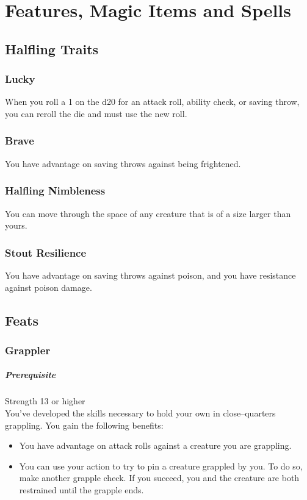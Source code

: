 \documentclass[letterpaper,openany,oneside,twocolumn]{book}
\begin{document}
\onecolumn


\rendercharactersheet

\renderbackgroundsheet

\renderspellsheet


\restoregeometry
\twocolumn

\chapter*{Features, Magic Items and Spells}

\section*{Halfling Traits}
\subsection*{Lucky}
When you roll a 1 on the d20 for an attack roll, ability check, or saving throw, you can reroll the die and must use the new roll.
\subsection*{Brave}
You have advantage on saving throws against being frightened.
\subsection*{Halfling Nimbleness}
You can move through the space of any creature that is of a size larger than yours.
\subsection*{Stout Resilience}
You have advantage on saving throws against poison, and you have resistance against poison damage.

\section*{Feats}
\subsection*{Grappler}
\paragraph*{Prerequisite} Strength 13 or higher\\
You've developed the skills necessary to hold your own in close--quarters grappling. You gain the following benefits:
\begin{itemize}
	\item You have advantage on attack rolls against a creature you are grappling.
	\item You can use your action to try to pin a creature grappled by you. To do so, make another grapple check. If you succeed, you and the creature are both restrained until the grapple ends.
\end{itemize}
\end{document}
